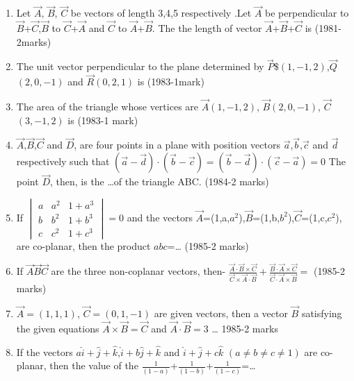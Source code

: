 
\iffalse
  \title{Vector-Algebra}
  \author{KOTHAPALLI AKHIL}
  \section{fitb}
\fi
\begin{enumerate}
    \item Let $\Vec{A}$, $\vec{B}$, $\vec{C}$ be vectors of length 3,4,5 respectively .Let $\vec{A}$ be perpendicular to $\vec{B}$+$\vec{C}$,$\vec{B}$ to $\vec{C}$+$\vec{A}$ and $\vec{C}$ to $\vec{A}$+$\vec{B}$. The the length of vector $\vec{A}$+$\vec{B}$+$\vec{C}$ is
    \hfill{(1981-2marks)}
    \item The unit vector perpendicular to the plane determined by $\vec{P}$$\$(1,-1,2)$,$\vec{Q}$$(2,0,-1)$ and $\vec{R}$$(0,2,1)$ is
    \hfill{(1983-1mark)}
    \item The area of the triangle whose vertices are $\vec{A}$$(1,-1,2)$, $\vec{B}$$(2,0,-1)$, $\vec{C}$$(3,-1,2)$ is
    \hfill{(1983-1 mark)}
    \item $\vec{A}$,$\vec{B}$,$\vec{C}$ and $\vec{D}$, are four points in a plane with position vectors $\vec{a}$,$\vec{b}$,$\vec{c}$ and $\vec{d}$ respectively such that $(\vec{a}-\vec{d})\cdot(\vec{b}-\vec{c})=(\vec{b}-\vec{d})\cdot(\vec{c}-\vec{a})=0$
    The point $\vec{D}$, then, is the \dots of the triangle ABC.
    \hfill{(1984-2 marks)}
    \item If $ 
 \begin{vmatrix}
a & a^2 & 1+a^3\\
b & b^2 & 1+b^3\\
c & c^2 & 1+c^3
\end{vmatrix}
=0$ and the vectors $\vec{A}$=(1,a,$a^2$),$\vec{B}$=(1,b,$b^2$),$\vec{C}$=(1,c,$c^2$), are co-planar, then the product $abc$=\dots
\hfill{(1985-2 marks)}
\item If $\vec{A}$$\vec{B}$$\vec{C}$ are the three non-coplanar vectors, then- $\frac{\vec{A}\cdot\vec{B}\times\vec{C}}{\vec{C}\times\vec{A}\cdot\vec{B}}+\frac{\vec{B}\cdot\vec{A}\times\vec{C}}{\vec{C}\cdot\vec{A}\times\vec{B}}=$
\hfill{(1985-2 marks)}
\item $\vec{A}=(1,1,1)$, $\vec{C}=(0,1,-1)$ are given vectors, then a vector $\vec{B}$ satisfying the given equations $\vec{A}\times\vec{B}=\vec{C}$ and $\vec{A}\cdot\vec{B}=3$ \dots
\hfill{1985-2 marks}
\item If the vectors $a\hat{i}+\hat{j}+\hat{k}$,$\hat{i}+b\hat{j}+\hat{k}$ and $\hat{i}+\hat{j}+c\hat{k}$ $(a\neq b\neq c\neq 1)$ are co-planar, then the value of the $\frac{1}{(1-a)}$+$\frac{1}{(1-b)}$+$\frac{1}{(1-c)}$=\dots

\end{enumerate}

